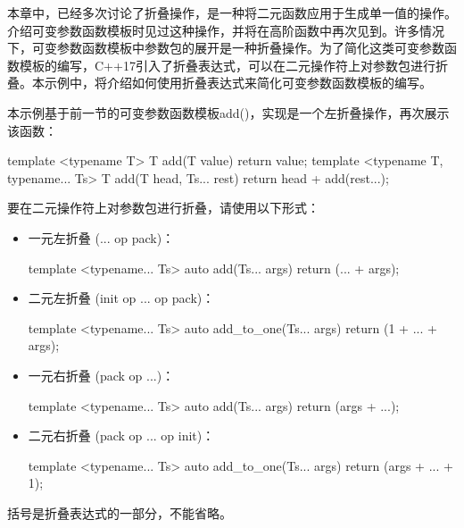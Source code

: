 本章中，已经多次讨论了折叠操作，是一种将二元函数应用于生成单一值的操作。介绍可变参数函数模板时见过这种操作，并将在高阶函数中再次见到。许多情况下，可变参数函数模板中参数包的展开是一种折叠操作。为了简化这类可变参数函数模板的编写，C++17引入了折叠表达式，可以在二元操作符上对参数包进行折叠。本示例中，将介绍如何使用折叠表达式来简化可变参数函数模板的编写。


本示例基于前一节的可变参数函数模板add()，实现是一个左折叠操作，再次展示该函数：

\begin{cpp}
template <typename T>
T add(T value)
{
    return value;
}
template <typename T, typename... Ts>
T add(T head, Ts... rest)
{
    return head + add(rest...);
}
\end{cpp}


要在二元操作符上对参数包进行折叠，请使用以下形式：

\begin{itemize}
\item
一元左折叠 (... op pack)：

\begin{cpp}
template <typename... Ts>
auto add(Ts... args)
{
    return (... + args);
}
\end{cpp}

\item
二元左折叠 (init op ... op pack)：

\begin{cpp}
template <typename... Ts>
auto add_to_one(Ts... args)
{
    return (1 + ... + args);
}
\end{cpp}

\item
一元右折叠 (pack op ...)：

\begin{cpp}
template <typename... Ts>
auto add(Ts... args)
{
    return (args + ...);
}
\end{cpp}

\item
二元右折叠 (pack op ... op init)：

\begin{cpp}
template <typename... Ts>
auto add_to_one(Ts... args)
{
    return (args + ... + 1);
}
\end{cpp}
\end{itemize}

\begin{myNotic}
括号是折叠表达式的一部分，不能省略。
\end{myNotic}

